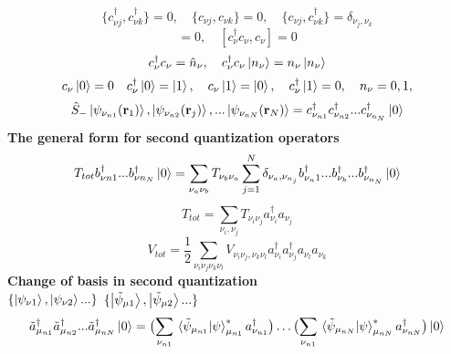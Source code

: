 \documentclass{article}
\begin{document}
\begin{equation*}
    \{ c^{\dagger}_{\nu j} ,c^{\dagger}_{\nu k} \} = 0 ,\quad \{ c_{\nu j} ,c_{\nu k} \} = 0  ,\quad \{ c_{\nu j} ,c^{\dagger}_{\nu k} \} = \delta_{\nu_j,\nu_k}
\end{equation*}
\begin{equation*}  
    [c^{\dagger}_{\nu} c_\nu , c_\nu] = 0 ,\quad [ c^{\dagger}_{\nu} c_\nu , c_\nu] = 0
\end{equation*}
\begin{equation*}
    c^{\dagger}_{\nu} c_\nu = \hat{n}_{\nu} , \quad c^{\dagger}_{\nu} c_\nu \ket{n_\nu} = n_{\nu}\ket{n_\nu} 
\end{equation*}
\begin{equation*}
    c_{\nu} \ket{0} = 0 \quad  c^{\dagger}_{\nu} \ket{0} = \ket{1} , \quad c_{\nu} \ket{1} = \ket{0} , \quad c^{\dagger}_{\nu} \ket{1}=0, \quad n_{\nu}=0,1,
\end{equation*}
\begin{equation*}
    \hat{S}_{-} \ket{\psi_{\nu_{n1}}(\textbf{r}_1)},\ket{\psi_{\nu_{n2}}(\textbf{r}_j)},...\ket{\psi_{\nu_{nN}}(\textbf{r}_N)}=c^{\dagger}_{\nu_{n1}}c^{\dagger}_{\nu_{n2}}...c^{\dagger}_{\nu_{n_N}}\ket{0}
\end{equation*}
\textbf{The general form for second quantization operators}
\begin{equation*}
    T_{tot} b^{\dagger}_{\nu n1}...b^{\dagger}_{\nu n_N}\ket{0}=\sum_{\nu_a \nu_b}^{}T_{\nu_b \nu_a} \sum_{j=1}^{N}\delta_{\nu_a,\nu_{n_j}}b^{\dagger}_{\nu_n1}... b^{\dagger}_{\nu_b} ... b^{\dagger}_{\nu_{n_N}}\ket{0}
\end{equation*}
\begin{equation*}
    T_{tot}=\sum^{}_{\nu_i,\nu_j} T_{\nu_i \nu_j} a^{\dagger}_{\nu_i} a_{\nu_j}
\end{equation*}
\begin{equation*}
    V_{tot}=\frac{1}{2} \sum_{\nu_i \nu_j \nu_k \nu_l} V_{\nu_i \nu_j,\nu_k \nu_l} a^{\dagger}_{\nu_i} a^{\dagger}_{\nu_j} a_{\nu_l} a_{\nu_k}
\end{equation*}
\textbf{Change of basis in second quantization} \\
$\{ \ket{\psi_{\nu1}},\ket{\psi_{\nu2}} ... \}$
$\{ \ket{\tilde{\psi}_{\mu1}},\ket{\tilde{\psi}_{\mu2}} ... \}$
\begin{equation*}
    \tilde{a}^{\dagger}_{\mu_{n1}}\tilde{a}^{\dagger}_{\mu_{n2}} ... \tilde{a}^{\dagger}_{\mu_{nN}}\ket{0} = \bigl(\sum_{\nu_{n1}} \braket*{\tilde{\psi}_{\mu_{n1}}}{\psi}_{\mu_{n1}}^{*}a^\dagger_{\nu_{n1}}\bigr) \dots \bigl(\sum_{\nu_{n1}} \braket*{\tilde{\psi}_{\mu_{nN}}}{\psi}_{\mu_{nN}}^{*}a^\dagger_{\nu_{nN}}\bigr)\ket{0}
\end{equation*}
\end{document}
